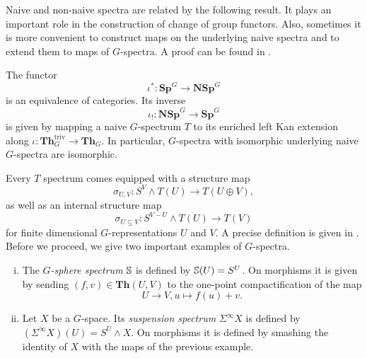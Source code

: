 Naive and non-naive spectra are related by the following result. It plays an important
role in the construction of change of group functors. Also, sometimes it is more convenient
to construct maps on the underlying naive spectra and to extend them to maps
of $G$-spectra. A proof can be found in \cite[Proposition~A.19, \pno~147]{hillhopkinsravenel}.
\begin{thm}\label{thm:naiveisnotnaive}
The functor
\[
\iota^\ast: \mathbf{Sp}^G\to \mathbf{NSp}^G
\]
is an equivalence of categories. 
Its inverse
\[
\iota_!: \mathbf{NSp}^G\to \mathbf{Sp}^G
\]
is given by mapping a naive $G$-spectrum $T$
to its enriched left Kan extension along $\iota:\mathbf{Th}^{\mathrm{triv}}_G\to 
\mathbf{Th}_G$.
In particular, $G$-spectra
with isomorphic underlying naive $G$-spectra are isomorphic.
\end{thm}

Every $T$ spectrum comes equipped with a structure map
\begin{equation}\label{eq:structuremap}
\sigma_{U,V}: S^V\wedge T(U)\to T(U\oplus V),
\end{equation}
as well as an internal structure map
\begin{equation}\label{eq:internalstructuremap}
\sigma_{U\subseteq V}: S^{V-U}\wedge T(U)\to T(V)
\end{equation}
for finite dimensional $G$-representations $U$ and $V$.
A precise definition is given in \cite[Definition~4.6, \pno~1505]{rvadams}.
Before we proceed, we give two important examples of $G$-spectra.
\begin{bsp}
\begin{enumerate}[(i)]
\item The $G$\textit{-sphere spectrum} $\mathbb{S}$
is defined by $\mathbb{S}(U) = S^U$. On morphisms
it is given by sending $(f,v)\in \mathbf{Th}(U,V)$
to the one-point compactification of the map
\[
U\to V, u\mapsto f(u)+v.
\]
\item Let $X$ be a $G$-space. Its \textit{suspension spectrum}
$\Sigma^\infty X$ is defined by $(\Sigma^\infty X)(U) = S^U\wedge X$.
On morphisms it is defined by smashing the identity of $X$ with the
maps of the previous example.
\end{enumerate}
\end{bsp}

